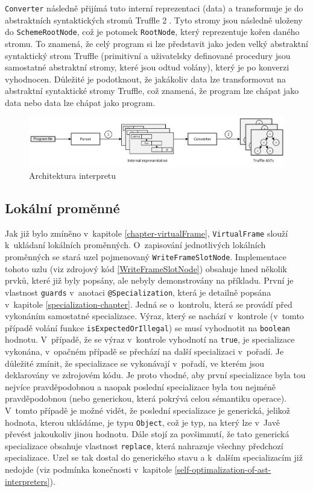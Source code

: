 \documentclass[
  master,
  biblatex,
  figures=true,
  theorems,
  sourcecodes,
  glossaries,
  index
]{kidiplom}
\begin{document}
\texttt{Converter} následně přijímá tuto interní reprezentaci (data) a transformuje je do abstraktních syntaktických stromů Truffle {\Large \textcircled{\normalsize 2}}. Tyto stromy jsou následně uloženy do \texttt{SchemeRootNode}, což je potomek \texttt{RootNode}, který reprezentuje kořen daného stromu. To znamená, že celý program si lze představit jako jeden velký abstraktní syntaktický strom Truffle (primitivní a uživatelsky definované procedury jsou samostatné abstraktní stromy, které jsou odtud volány), který je po konverzi vyhodnocen. Důležité je podotknout, že jakákoliv data lze transformovat na abstraktní syntaktické stromy Truffle, což znamená, že program lze chápat jako data nebo data lze chápat jako program. 



\begin{figure} [h]
    \centering
    \includegraphics[width= 1\textwidth]{images/interpreter-architecture.png}
    \caption{Architektura interpretu}
    \label{fig:interpreter-architecture}
\end{figure}


\subsection{Lokální proměnné}
Jak již bylo zmíněno v~kapitole \ref{chapter-virtualFrame}, \texttt{VirtualFrame} slouží k~ukládaní lokálních proměnných. O~zapisování jednotlivých lokálních proměnných se stará uzel pojmenovaný \texttt{WriteFrameSlotNode}. Implementace tohoto uzlu (viz zdrojový kód \ref{WriteFrameSlotNode}) obsahuje hned několik prvků, které již byly popsány, ale nebyly demonstrovány na příkladu. První je vlastnost \texttt{guards} v~anotaci \texttt{@Specialization}, která je detailně popsána v~kapitole \ref{specialization-chapter}. Jedná se o~kontrolu, která se provádí před vykonáním samostatné specializace. Výraz, který se nachází v~kontrole (v~tomto případě volání funkce \texttt{isExpectedOrIllegal}) se musí vyhodnotit na \texttt{boolean} hodnotu. V~případě, že se výraz v~kontrole vyhodnotí na \texttt{true}, je specializace vykonána, v~opačném případě se přechází na další specializaci v~pořadí. Je důležité zmínit, že specializace se vykonávají v~pořadí, ve kterém jsou deklarovány ve zdrojovém kódu. Je proto vhodné, aby první specializace byla tou nejvíce pravděpodobnou a naopak poslední specializace byla tou nejméně pravděpodobnou (nebo generickou, která pokrývá celou sémantiku operace). V~tomto případě je možné vidět, že poslední specializace je generická, jelikož hodnota, kterou ukládáme, je typu \texttt{Object}, což je typ, na který lze v~Javě převést jakoukoliv jinou hodnotu. Dále stojí za povšimnutí, že tato generická specializace obsahuje vlastnost \texttt{replace}, která nahrazuje všechny předchozí specializace. Uzel se tak dostal do generického stavu a k~dalším specializacím již nedojde (viz podmínka konečnosti v~kapitole \ref{self-optimalization-of-ast-interpreters}).
\end{document}
